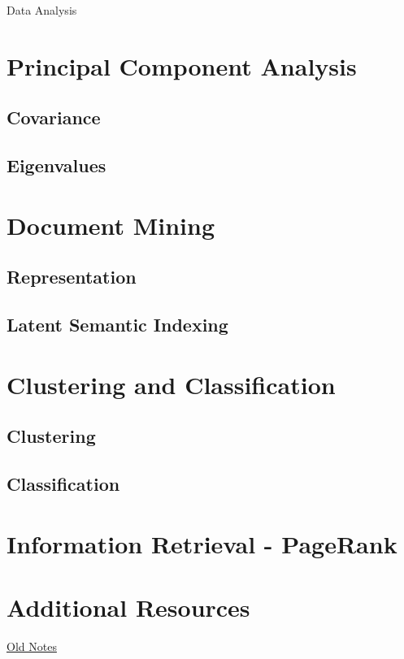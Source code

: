 Data Analysis
\section{Principal Component Analysis}
\subsection{Covariance}
\subsection{Eigenvalues}
\section{Document Mining}
\subsection{Representation}
\subsection{Latent Semantic Indexing}
\section{Clustering and Classification}
\subsection{Clustering}
\subsection{Classification}
\section{Information Retrieval - PageRank}
\section{Additional Resources}
\href{http://www.cs.bham.ac.uk/~pxt/ida.html}{Old Notes}
